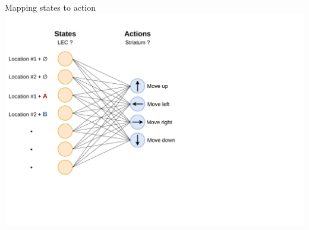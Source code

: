 \documentclass[bigger]{beamer}
\begin{document}
\begin{frame}[label={sec:org30fd8e0}]{Mapping states to action}
\centering
\vspace{2em}
        \includegraphics[height=0.8\textheight, trim=0cm 6cm 15cm 2cm]{img/RL_mapping-states-to-actions.drawio.pdf}
\end{frame}
\end{document}
